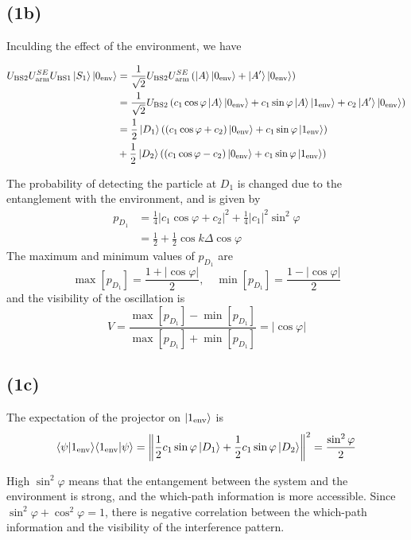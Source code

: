 \documentclass[a4paper,11pt]{article}
\begin{document}
\subsection{(1b)}

Inculding the effect of the environment, we have

\begin{align}
    U_{\text{BS2}}U_{\text{arm}}^{SE}U_{\text{BS1}}\ket{S_1}\ket{0_\text{env}}
    &= \frac{1}{\sqrt{2}}U_{\text{BS2}}U_{\text{arm}}^{SE}\left(\ket{A}\ket{0_\text{env}} + \ket{A'}\ket{0_\text{env}}\right) \\
    &= \frac{1}{\sqrt{2}}U_{\text{BS2}}\left(c_1\cos\varphi\ket{A}\ket{0_\text{env}} + c_1\sin\varphi\ket{A}\ket{1_\text{env}} + c_2\ket{A'}\ket{0_\text{env}}\right) \\
    &= \frac{1}{2}\ket{D_1}((c_1\cos\varphi + c_2)\ket{0_\text{env}} + c_1\sin\varphi \ket{1_\text{env}})\\ 
    &+ \frac{1}{2}\ket{D_2}((c_1\cos\varphi - c_2)\ket{0_\text{env}} + c_1\sin\varphi \ket{1_\text{env}})
\end{align}

The probability of detecting the particle at $D_1$ is changed due to the entanglement with the environment, and is given by
\begin{align}
    p_{D_1} &= \frac{1}{4}\left|c_1\cos\varphi + c_2\right|^2 + \frac{1}{4}|c_1|^2\sin^2\varphi \\
    &= \frac{1}{2}+ \frac{1}{2}\cos k\Delta\cos\varphi
\end{align}
The maximum and minimum values of $p_{D_1}$ are
\begin{equation}
    \max[p_{D_1}] = \frac{1 + |\cos\varphi|}{2}, \quad \min[p_{D_1}] = \frac{1 - |\cos\varphi|}{2}
\end{equation}
and the visibility of the oscillation is
\begin{equation}
    V = \frac{\max[p_{D_1}] - \min[p_{D_1}]}{\max[p_{D_1}] + \min[p_{D_1}]} = |\cos\varphi|
\end{equation}


\subsection{(1c)}


The expectation of the projector on $\ket{1_\text{env}}$ is
\begin{equation}
   \langle \psi |1_\text{env}\rangle\langle1_\text{env}|\psi\rangle 
    = \left\|\frac{1}{2} c_1\sin\varphi\ket{D_1} + \frac{1}{2} c_1\sin\varphi\ket{D_2} \right\|^2 = \frac{\sin^2\varphi}{2}
\end{equation}


High $\sin^2\varphi$ means that the entangement between the system and the environment is strong, and the which-path information is more accessible. Since $\sin^2\varphi + \cos^2\varphi = 1$, there is negative correlation between the which-path information and the visibility of the interference pattern.
\end{document}

